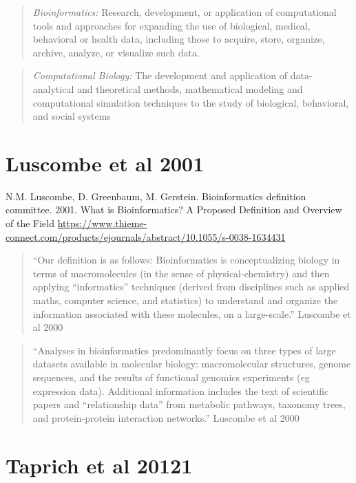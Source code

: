 \documentclass[
]{book}
\begin{document}
\begin{quote}
\emph{Bioinformatics:} Research, development, or application of computational tools and approaches for expanding the use of biological, medical, behavioral or health data, including those to acquire, store, organize, archive, analyze, or visualize such data.
\end{quote}

\begin{quote}
\emph{Computational Biology:} The development and application of data-analytical and
theoretical methods, mathematical modeling and computational simulation techniques
to the study of biological, behavioral, and social systems
\end{quote}

\hypertarget{luscombe-et-al-2001}{%
\section{Luscombe et al 2001}\label{luscombe-et-al-2001}}

N.M. Luscombe, D. Greenbaum, M. Gerstein. Bioinformatics definition committee. 2001. What is Bioinformatics? A Proposed Definition and Overview of the Field \url{https://www.thieme-connect.com/products/ejournals/abstract/10.1055/s-0038-1634431}

\begin{quote}
``Our definition is as follows: Bioinformatics is conceptualizing biology in terms of macromolecules (in the sense of physical-chemistry) and then applying ``informatics'' techniques (derived from disciplines such as applied maths, computer science, and statistics) to understand and organize the information associated with these molecules, on a large-scale.'' Luscombe et al 2000
\end{quote}

\begin{quote}
``Analyses in bioinformatics predominantly focus on three types of large datasets available in molecular biology: macromolecular structures, genome sequences, and the results of functional genomics experiments (eg expression data). Additional information includes the text of scientific papers and ``relationship data'' from metabolic pathways, taxonomy trees, and protein-protein interaction networks.'' Luscombe et al 2000
\end{quote}

\hypertarget{taprich-et-al-20121}{%
\section{Taprich et al 20121}\label{taprich-et-al-20121}}
\end{document}
